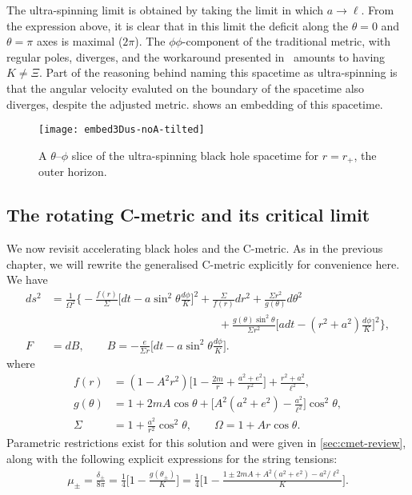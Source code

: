 \documentclass[
twoside,
openright,
frontopenright,
]{dmathesis}
\newcommand{\nn}{\nonumber}
\begin{document}
The ultra-spinning limit is obtained by taking the limit in which
$a\to\ell$. From the expression above, it is clear that in this limit the
deficit along the $\theta = 0$ and $\theta=\pi$ axes is maximal ($2\pi$). The
$\phi\phi$-component of the traditional metric, with regular poles, diverges,
and the workaround presented in~\cite{Hennigar:2014cfa} amounts to having
$K\neq \Xi$. Part of the reasoning behind naming this spacetime as ultra-spinning
is that the angular velocity evaluted on the boundary of the spacetime also
diverges, despite the adjusted metric.  shows an
embedding of this spacetime.


\begin{figure}
  \centering
  \texttt{[image: embed3Dus-noA-tilted]}
  \caption{\label{fig:embed3Dus-noA-tilted}A $\theta$--$\phi$ slice of the
    ultra-spinning black hole spacetime for $r=r_+$, the outer horizon.}
\end{figure}

\subsection{The rotating C-metric and its critical limit}
We now revisit accelerating black holes and the C-metric. As in the previous
chapter, we will rewrite the generalised C-metric explicitly for convenience
here. We have
\begin{align}
  ds^2 &= \frac{1}{\Omega^2}\bigg\{ -\frac{f(r)}{\Sigma}\Big[dt - a\sin^2\theta
         \frac{d\phi}{K} \Big]^2 + \frac{\Sigma}{f(r)}dr^2 + \frac{\Sigma
         r^2}{g(\theta)}d\theta^2 \nn\\
  &\hspace{15em} + \frac{g(\theta) \sin^2\theta}{\Sigma r^2} \Big[adt-(r^2+a^2)
    \frac{d\phi}{K}\Big]^2\bigg\},\nn\\ 
  F&=dB,\qquad B=-\frac{e}{\Sigma r}\Big[dt-a\sin^2\theta \frac{d\phi}{K}\Big].
\label{eq:cmetric4}
\end{align}
where
\begin{align}
f(r)&=(1-A^2r^2)\bigg[1-\frac{2m}{r}+\frac{a^2+e^2}{r^2}\bigg]+\frac{r^2+a^2}{\ell^2},\nn\\
g(\theta) &=
1+2mA\cos\theta+\bigg[A^2(a^2+e^2)-\frac{a^2}{\ell^2}\bigg]\cos^2\theta,\nn\\ 
\Sigma&=1+\frac{a^2}{r^2}\cos^2\theta, \qquad \Omega=1+Ar\cos\theta.
\label{eq:cmetric4-fun}
\end{align}
Parametric restrictions exist for this solution and were given in
\cref{sec:cmet-review}, along with the following explicit expressions for the
string tensions:
\begin{align}
  \label{eq:tensions}
  \mu_\pm = \frac{\delta_\pm}{8\pi}=\frac14\bigg[1-\frac{g(\theta_\pm)}{K}\bigg] =
  \frac14\bigg[1-\frac{1\pm 2mA + A^2(a^2+e^2)-a^2/\ell^2}{K}\bigg]. 
\end{align}
\end{document}
